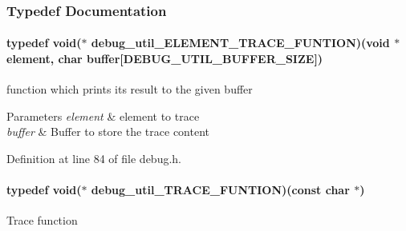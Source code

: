 \subsubsection{Typedef Documentation}
\hypertarget{a00001_acb797b3ccc582e3330d3cf3e761b3616}{
\paragraph[{debug\-\_\-util\-\_\-\-E\-L\-E\-M\-E\-N\-T\-\_\-\-T\-R\-A\-C\-E\-\_\-\-F\-U\-N\-T\-I\-O\-N}]{\setlength{\rightskip}{0pt plus 5cm}typedef void($\ast$ debug\-\_\-util\-\_\-\-E\-L\-E\-M\-E\-N\-T\-\_\-\-T\-R\-A\-C\-E\-\_\-\-F\-U\-N\-T\-I\-O\-N)(void $\ast$element, char buffer\mbox{[}D\-E\-B\-U\-G\-\_\-\-U\-T\-I\-L\-\_\-\-B\-U\-F\-F\-E\-R\-\_\-\-S\-I\-Z\-E\mbox{]})}}\label{a00001_acb797b3ccc582e3330d3cf3e761b3616}
function which prints its result to the given buffer 
\begin{DoxyParams}{Parameters}
{\em element} & element to trace \\
\hline
{\em buffer} & Buffer to store the trace content \\
\hline
\end{DoxyParams}


Definition at line 84 of file debug.\-h.

\hypertarget{a00001_aea1a1da48f9be116b8ec308d8bc29b76}{
\paragraph[{debug\-\_\-util\-\_\-\-T\-R\-A\-C\-E\-\_\-\-F\-U\-N\-T\-I\-O\-N}]{\setlength{\rightskip}{0pt plus 5cm}typedef void($\ast$ debug\-\_\-util\-\_\-\-T\-R\-A\-C\-E\-\_\-\-F\-U\-N\-T\-I\-O\-N)(const char $\ast$)}}\label{a00001_aea1a1da48f9be116b8ec308d8bc29b76}
Trace function 

